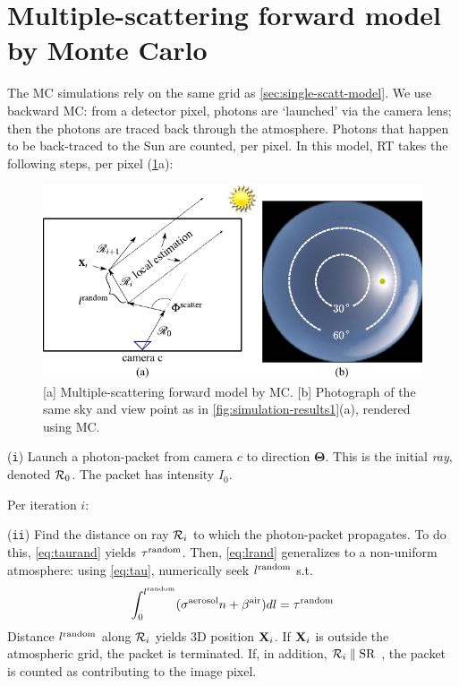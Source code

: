 \documentclass[10pt,letterpaper]{article}
\newcommand{\yoavcomment}[1]{}
\renewcommand{\yoavcomment}[1]{#1} %
\begin{document}
\section{Multiple-scattering forward model by Monte Carlo}
\label{sec:monte-carlo-simul}


The MC simulations rely on the same grid as
\cref{sec:single-scatt-model}. We use backward MC: from a detector
pixel, photons are `launched' via the camera lens; then the photons
are traced back through the atmosphere. Photons that happen to be
back-traced to the Sun are counted, per pixel. In this model, RT takes
the following steps, per pixel (\cref{fig:mcgrid}a):
\begin{figure}
  \centering
  \yoavcomment{\includegraphics{images/mcgrid.pdf}}
  \caption{\small [a] Multiple-scattering forward model by MC.
    [b] Photograph of the same sky and view point as in
    \cref{fig:simulation-results1}(a), rendered using MC.}
  \label{fig:mcgrid}
\end{figure}

\noindent ({\tt i}) Launch a photon-packet from camera $c$ to
direction ${\bm{\Theta}}$. This is the initial {\em ray}, denoted
${\cal R}_0$. The packet has intensity $I_0$.

\noindent Per iteration $i$:

\noindent ({\tt ii}) Find the distance on ray ${\cal R}_{i}$ to which
the photon-packet propagates. To do this, \cref{eq:taurand}
yields $\tau^{\rm random}$. Then, \cref{eq:lrand} generalizes to
a non-uniform atmosphere: using \cref{eq:tau}, numerically seek
$l^{\rm random}$ s.t.
\begin{align}
  \int_0^{l^{\rm random}}(\sigma^{\rm aerosol} n +\beta^{\rm air}) dl
  = \tau^{\rm random}
  \label{eq:MCextinct}
\end{align}
Distance $l^{\rm random}$ along ${\cal R}_{i}$ yields 3D position ${\bf
  X}_{i}$.  If ${\bf X}_{i}$ is outside the atmospheric grid, the
packet is terminated. If, in addition, ${\cal R}_{i}\parallel {\rm
  SR}$ , the packet is counted as contributing to the image pixel.
\end{document}
